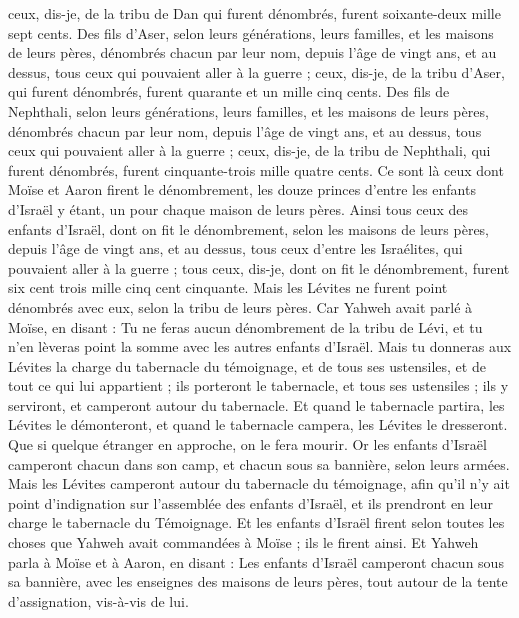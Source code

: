 \begin{multicols}{2}
ceux, dis-je, de la tribu de Dan qui furent dénombrés, furent soixante-deux mille sept cents.
Des fils d'Aser, selon leurs générations, leurs familles, et les maisons de leurs pères, dénombrés chacun par leur nom, depuis l'âge de vingt ans, et au dessus, tous ceux qui pouvaient aller à la guerre ;
ceux, dis-je, de la tribu d'Aser, qui furent dénombrés, furent quarante et un mille cinq cents.
Des fils de Nephthali, selon leurs générations, leurs familles, et les maisons de leurs pères, dénombrés chacun par leur nom, depuis l'âge de vingt ans, et au dessus, tous ceux qui pouvaient aller à la guerre ;
ceux, dis-je, de la tribu de Nephthali, qui furent dénombrés, furent cinquante-trois mille quatre cents.
Ce sont là ceux dont Moïse et Aaron firent le dénombrement, les douze princes d'entre les enfants d'Israël y étant, un pour chaque maison de leurs pères.
Ainsi tous ceux des enfants d'Israël, dont on fit le dénombrement, selon les maisons de leurs pères, depuis l'âge de vingt ans, et au dessus, tous ceux d'entre les Israélites, qui pouvaient aller à la guerre ;
tous ceux, dis-je, dont on fit le dénombrement, furent six cent trois mille cinq cent cinquante.
Mais les Lévites ne furent point dénombrés avec eux, selon la tribu de leurs pères.
Car Yahweh avait parlé à Moïse, en disant :
Tu ne feras aucun dénombrement de la tribu de Lévi, et tu n'en lèveras point la somme avec les autres enfants d'Israël.
Mais tu donneras aux Lévites la charge du tabernacle du témoignage, et de tous ses ustensiles, et de tout ce qui lui appartient ; ils porteront le tabernacle, et tous ses ustensiles ; ils y serviront, et camperont autour du tabernacle.
Et quand le tabernacle partira, les Lévites le démonteront, et quand le tabernacle campera, les Lévites le dresseront. Que si quelque étranger en approche, on le fera mourir.
Or les enfants d'Israël camperont chacun dans son camp, et chacun sous sa bannière, selon leurs armées.
Mais les Lévites camperont autour du tabernacle du témoignage, afin qu'il n'y ait point d'indignation sur l'assemblée des enfants d'Israël, et ils prendront en leur charge le tabernacle du Témoignage.
Et les enfants d'Israël firent selon toutes les choses que Yahweh avait commandées à Moïse ; ils le firent ainsi.
\VerseOne{}Et Yahweh parla à Moïse et à Aaron, en disant :
Les enfants d'Israël camperont chacun sous sa bannière, avec les enseignes des maisons de leurs pères, tout autour de la tente d'assignation, vis-à-vis de lui.

\end{multicols}
